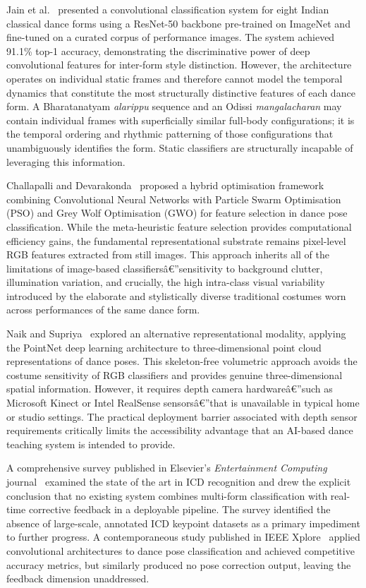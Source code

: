 \documentclass[journal]{IEEEtran}
\begin{document}
Jain et al.~\cite{jain2021} presented a convolutional classification
system for eight Indian classical dance forms using a ResNet-50
backbone pre-trained on ImageNet and fine-tuned on a curated corpus
of performance images. The system achieved 91.1\% top-1 accuracy,
demonstrating the discriminative power of deep convolutional features
for inter-form style distinction. However, the architecture operates
on individual static frames and therefore cannot model the temporal
dynamics that constitute the most structurally distinctive features of
each dance form. A Bharatanatyam \textit{alarippu} sequence and an
Odissi \textit{mangalacharan} may contain individual frames with
superficially similar full-body configurations; it is the temporal
ordering and rhythmic patterning of those configurations that
unambiguously identifies the form. Static classifiers are structurally
incapable of leveraging this information.

Challapalli and Devarakonda~\cite{challapalli2022} proposed a hybrid
optimisation framework combining Convolutional Neural Networks with
Particle Swarm Optimisation (PSO) and Grey Wolf Optimisation (GWO)
for feature selection in dance pose classification. While the
meta-heuristic feature selection provides computational efficiency
gains, the fundamental representational substrate remains pixel-level
RGB features extracted from still images. This approach inherits all of
the limitations of image-based classifiersâ€”sensitivity to background
clutter, illumination variation, and crucially, the high intra-class
visual variability introduced by the elaborate and stylistically
diverse traditional costumes worn across performances of the same
dance form.

Naik and Supriya~\cite{naik2021} explored an alternative
representational modality, applying the PointNet deep learning
architecture to three-dimensional point cloud representations of dance
poses. This skeleton-free volumetric approach avoids the costume
sensitivity of RGB classifiers and provides genuine three-dimensional
spatial information. However, it requires depth camera hardwareâ€”such
as Microsoft Kinect or Intel RealSense sensorsâ€”that is unavailable
in typical home or studio settings. The practical deployment barrier
associated with depth sensor requirements critically limits the
accessibility advantage that an AI-based dance teaching system is
intended to provide.

A comprehensive survey published in Elsevier's \textit{Entertainment
Computing} journal~\cite{survey2024} examined the state of the art in
ICD recognition and drew the explicit conclusion that no existing system
combines multi-form classification with real-time corrective feedback
in a deployable pipeline. The survey identified the absence of
large-scale, annotated ICD keypoint datasets as a primary impediment
to further progress. A contemporaneous study published in
IEEE Xplore~\cite{ieee2025} applied convolutional architectures
to dance pose classification and achieved competitive accuracy metrics,
but similarly produced no pose correction output, leaving the
feedback dimension unaddressed.
\end{document}
